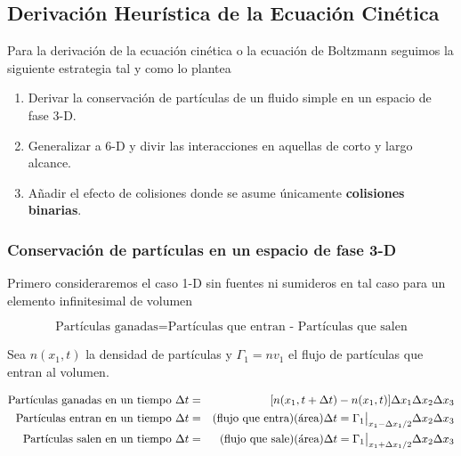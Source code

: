 \subsection{Derivaci\'on Heur\'istica de la Ecuaci\'on Cin\'etica}

Para la derivaci\'on de la ecuaci\'on cin\'etica o la ecuaci\'on de Boltzmann seguimos la siguiente estrategia tal y como lo plantea \cite{freidberg2014}

\begin{enumerate}
  \item Derivar la conservaci\'on de part\'iculas de un fluido simple en un espacio de fase 3-D.
  \item Generalizar a 6-D y divir las interacciones en aquellas de corto y largo alcance.
  \item A\~nadir el efecto de colisiones donde se asume \'unicamente \textbf{colisiones binarias}.
\end{enumerate} 

\subsubsection{Conservaci\'on de part\'iculas en un espacio de fase 3-D}

Primero consideraremos el caso 1-D sin fuentes ni sumideros en tal caso para un elemento infinitesimal de volumen 

\begin{equation*}
\text{Part\'iculas ganadas} = \text{Part\'iculas que entran - Part\'iculas que salen}
\end{equation*}

Sea $n(x_1, t)$ la densidad de part\'iculas y $\Gamma_{1} = nv_{1}$ el flujo de part\'iculas que entran al volumen.  

\begin{eqnarray}
  \text{Part\'iculas ganadas en un tiempo }  \Delta t &=& [n(x_1, t + \Delta t) - n(x_1,t)]\Delta x_1\Delta x_2\Delta x_3 \nonumber \\
  \text{Part\'iculas entran en un tiempo } \Delta t &=& (\text{flujo que entra})(\text{\'area})\Delta t = \Gamma_{1}\big{|}_{x_1 - \Delta x_1/2} \Delta x_2\Delta x_3 \nonumber\\
  \text{Part\'iculas salen en un tiempo } \Delta t &=& (\text{flujo que sale})(\text{\'area})\Delta t = \Gamma_{1}\big{|}_{x_1 + \Delta x_1/2}\Delta x_2\Delta x_3 \nonumber
\end{eqnarray}

